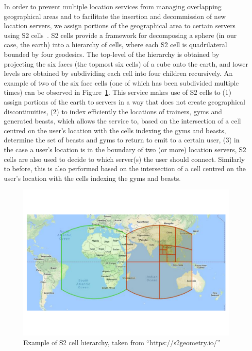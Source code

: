 In order to prevent multiple location services from managing overlapping geographical areas and to facilitate the insertion and decommission of new location servers, we assign portions of the geographical area to certain servers using S2 cells~\cite{s2geometry}. S2 cells provide a framework for decomposing a sphere (in our case, the earth) into a hierarchy of cells, where each S2 cell is quadrilateral bounded by four geodesics. The top-level of the hierarchy is obtained by projecting the six faces (the topmost six cells) of a cube onto the earth, and lower levels are obtained by subdividing each cell into four children recursively. An example of two of the six face cells (one of which has been subdivided multiple times) can be observed in Figure~\ref{fig:pouchbeasts-s2cells}. This service makes use of S2 cells to (1) assign portions of the earth to servers in a way that does not create geographical discontinuities, (2) to index efficiently the locations of trainers, gyms and generated beasts, which allows the service to, based on the intersection of a cell centred on the user's location with the cells indexing the gyms and beasts, determine the set of beasts and gyms to return to emit to a certain user, (3) in the case a user's location is in the boundary of two (or more) location servers, S2 cells are also used to decide to which server(s) the user should connect. Similarly to before, this is also performed based on the intersection of a cell centred on the user's location with the cells indexing the gyms and beasts.

\begin{figure}[htbp]
    \centering
    \includegraphics[width=\textwidth]{Chapters/benchmark/figures/s2_cells.pdf}
    \caption{Example of S2 cell hierarchy, taken from ``https://s2geometry.io/''}
    \label{fig:pouchbeasts-s2cells}
\end{figure}

